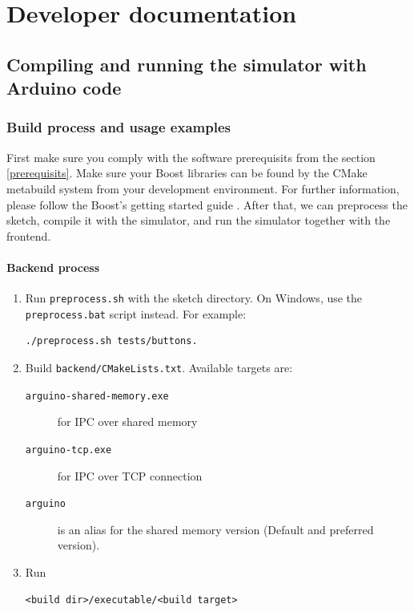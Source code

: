 \chapter{Developer documentation}

\section{Compiling and running the simulator with Arduino code}

\subsection{Build process and usage examples}

First make sure you comply with the software prerequisits from the section \ref{prerequisits}. Make sure your Boost libraries can be found by the CMake metabuild system from your development environment. For further information, please follow the Boost's getting started guide \cite{boost_get_started}. After that, we can preprocess the sketch, compile it with the simulator, and run the simulator together with the frontend.

\subsubsection{Backend process}
\begin{enumerate}
    \item Run \texttt{preprocess.sh} with the sketch directory. On Windows, use the \texttt{preprocess.bat} script instead. For example:
    
    \begin{lstlisting}[language=shell]
    ./preprocess.sh tests/buttons.
    \end{lstlisting}
    
    \item Build \texttt{backend/CMakeLists.txt}. Available targets are:
    
    \begin{description}
        \item[\texttt{arguino-shared-memory.exe}] for IPC over shared memory
        \item[\texttt{arguino-tcp.exe}] for IPC over TCP connection
        \item[\texttt{arguino}] is an alias for the shared memory version (Default and preferred version).
    \end{description}

    \item Run
    \begin{lstlisting}[language=shell]
    <build dir>/executable/<build target>
    \end{lstlisting}
    
\end{enumerate}


